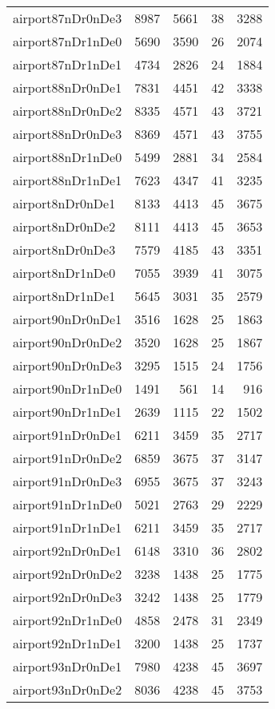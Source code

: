 \documentclass[../../../thesis.tex]{subfiles}
\begin{document}
\begin{longtable}{lrrrr}
airport87nDr0nDe3 & 8987 & 5661 & 38 & 3288 \\
airport87nDr1nDe0 & 5690 & 3590 & 26 & 2074 \\
airport87nDr1nDe1 & 4734 & 2826 & 24 & 1884 \\
airport88nDr0nDe1 & 7831 & 4451 & 42 & 3338 \\
airport88nDr0nDe2 & 8335 & 4571 & 43 & 3721 \\
airport88nDr0nDe3 & 8369 & 4571 & 43 & 3755 \\
airport88nDr1nDe0 & 5499 & 2881 & 34 & 2584 \\
airport88nDr1nDe1 & 7623 & 4347 & 41 & 3235 \\
airport8nDr0nDe1 & 8133 & 4413 & 45 & 3675 \\
airport8nDr0nDe2 & 8111 & 4413 & 45 & 3653 \\
airport8nDr0nDe3 & 7579 & 4185 & 43 & 3351 \\
airport8nDr1nDe0 & 7055 & 3939 & 41 & 3075 \\
airport8nDr1nDe1 & 5645 & 3031 & 35 & 2579 \\
airport90nDr0nDe1 & 3516 & 1628 & 25 & 1863 \\
airport90nDr0nDe2 & 3520 & 1628 & 25 & 1867 \\
airport90nDr0nDe3 & 3295 & 1515 & 24 & 1756 \\
airport90nDr1nDe0 & 1491 & 561 & 14 & 916 \\
airport90nDr1nDe1 & 2639 & 1115 & 22 & 1502 \\
airport91nDr0nDe1 & 6211 & 3459 & 35 & 2717 \\
airport91nDr0nDe2 & 6859 & 3675 & 37 & 3147 \\
airport91nDr0nDe3 & 6955 & 3675 & 37 & 3243 \\
airport91nDr1nDe0 & 5021 & 2763 & 29 & 2229 \\
airport91nDr1nDe1 & 6211 & 3459 & 35 & 2717 \\
airport92nDr0nDe1 & 6148 & 3310 & 36 & 2802 \\
airport92nDr0nDe2 & 3238 & 1438 & 25 & 1775 \\
airport92nDr0nDe3 & 3242 & 1438 & 25 & 1779 \\
airport92nDr1nDe0 & 4858 & 2478 & 31 & 2349 \\
airport92nDr1nDe1 & 3200 & 1438 & 25 & 1737 \\
airport93nDr0nDe1 & 7980 & 4238 & 45 & 3697 \\
airport93nDr0nDe2 & 8036 & 4238 & 45 & 3753 \\

\end{longtable}
\end{document}
